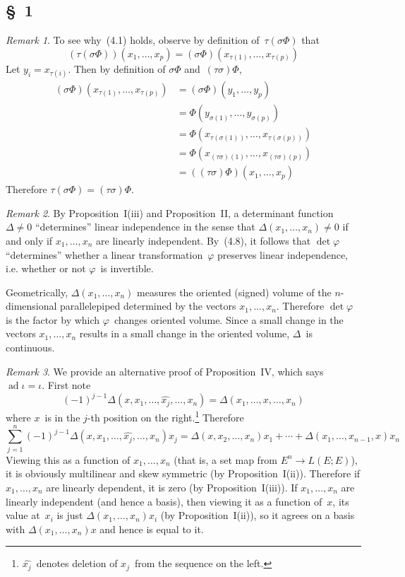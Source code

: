 \documentclass[letterpaper,12pt]{article}
\DeclareMathOperator{\ad}{ad}
\newcommand{\delete}{\widehat}
\theoremstyle{definition}
\theoremstyle{remark}
\newtheorem*{rmk}{Remark}
\begin{document}
\subsection*{\S~1}
\begin{rmk} To see why~(4.1) holds, observe by definition of~\(\tau(\sigma\Phi)\) that
\[(\tau(\sigma\Phi))(x_1,\ldots,x_p)=(\sigma\Phi)(x_{\tau(1)},\ldots,x_{\tau(p)})\]
Let \(y_i=x_{\tau(i)}\). Then by definition of \(\sigma\Phi\) and~\((\tau\sigma)\Phi\),
\begin{align*}
(\sigma\Phi)(x_{\tau(1)},\ldots,x_{\tau(p)})&=(\sigma\Phi)(y_1,\ldots,y_p)\\
	&=\Phi(y_{\sigma(1)},\ldots,y_{\sigma(p)})\\
	&=\Phi(x_{\tau(\sigma(1))},\ldots,x_{\tau(\sigma(p))})\\
	&=\Phi(x_{(\tau\sigma)(1)},\ldots,x_{(\tau\sigma)(p)})\\
	&=((\tau\sigma)\Phi)(x_1,\ldots,x_p)
\end{align*}
Therefore \(\tau(\sigma\Phi)=(\tau\sigma)\Phi\).
\end{rmk}

\begin{rmk}
By Proposition~I(iii) and Proposition~II, a determinant function \(\Delta\ne 0\) ``determines'' linear independence in the sense that \(\Delta(x_1,\ldots,x_n)\ne0\) if and only if \(x_1,\ldots,x_n\) are linearly independent. By~(4.8), it follows that \(\det\varphi\) ``determines'' whether a linear transformation~\(\varphi\) preserves linear independence, i.e. whether or not \(\varphi\)~is invertible.

Geometrically, \(\Delta(x_1,\ldots,x_n)\) measures the oriented (signed) volume of the \(n\)-dimensional parallelepiped determined by the vectors \(x_1,\ldots,x_n\). Therefore \(\det\varphi\) is the factor by which \(\varphi\)~changes oriented volume. Since a small change in the vectors \(x_1,\ldots,x_n\) results in a small change in the oriented volume, \(\Delta\)~is continuous.
\end{rmk}

\begin{rmk}
We provide an alternative proof of Proposition~IV, which says \(\ad\iota=\iota\). First note
\[(-1)^{j-1}\Delta(x,x_1,\ldots,\delete{x_j},\ldots,x_n)=\Delta(x_1,\ldots,x,\ldots,x_n)\]
where \(x\)~is in the \(j\)-th position on the right.\footnote{\(\delete{x_j}\)~denotes deletion of \(x_j\)~from the sequence on the left.} Therefore
\[\sum_{j=1}^n(-1)^{j-1}\Delta(x,x_1,\ldots,\delete{x_j},\ldots,x_n)x_j=\Delta(x,x_2,\ldots,x_n)x_1+\cdots+\Delta(x_1,\ldots,x_{n-1},x)x_n\]
Viewing this as a function of \(x_1,\ldots,x_n\) (that is, a set map from \(E^n\to L(E;E)\)), it is obviously multilinear and skew symmetric (by Proposition~I(ii)). Therefore if \(x_1,\ldots,x_n\) are linearly dependent, it is zero (by Proposition~I(iii)). If \(x_1,\ldots,x_n\) are linearly independent (and hence a basis), then viewing it as a function of~\(x\), its value at~\(x_i\) is just \(\Delta(x_1,\ldots,x_n)x_i\) (by Proposition~I(ii)), so it agrees on a basis with \(\Delta(x_1,\ldots,x_n)x\) and hence is equal to it.
\end{rmk}
\end{document}
